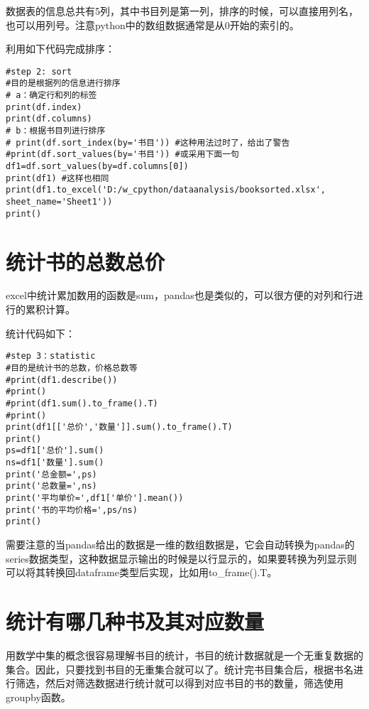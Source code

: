 \documentclass[twoside,11pt]{book}
\begin{document}
数据表的信息总共有5列，其中书目列是第一列，排序的时候，可以直接用列名，也可以用列号。注意python中的数组数据通常是从0开始的索引的。

利用如下代码完成排序：
\begin{lstlisting}
#step 2: sort
#目的是根据列的信息进行排序
# a：确定行和列的标签
print(df.index)
print(df.columns)
# b：根据书目列进行排序
# print(df.sort_index(by='书目')) #这种用法过时了，给出了警告
#print(df.sort_values(by='书目')) #或采用下面一句
df1=df.sort_values(by=df.columns[0])
print(df1) #这样也相同
print(df1.to_excel('D:/w_cpython/dataanalysis/booksorted.xlsx', sheet_name='Sheet1'))
print()
\end{lstlisting}

\section{统计书的总数总价}

excel中统计累加数用的函数是sum，pandas也是类似的，可以很方便的对列和行进行的累积计算。

统计代码如下：
\begin{lstlisting}
#step 3：statistic
#目的是统计书的总数，价格总数等
#print(df1.describe())
#print()
#print(df1.sum().to_frame().T)
#print()
print(df1[['总价','数量']].sum().to_frame().T)
print()
ps=df1['总价'].sum()
ns=df1['数量'].sum()
print('总金额=',ps)
print('总数量=',ns)
print('平均单价=',df1['单价'].mean())
print('书的平均价格=',ps/ns)
print()
\end{lstlisting}

需要注意的当pandas给出的数据是一维的数组数据是，它会自动转换为pandas的series数据类型，这种数据显示输出的时候是以行显示的，如果要转换为列显示则可以将其转换回dataframe类型后实现，比如用to\_frame().T。

\section{统计有哪几种书及其对应数量}

用数学中集的概念很容易理解书目的统计，书目的统计数据就是一个无重复数据的集合。因此，只要找到书目的无重集合就可以了。统计完书目集合后，根据书名进行筛选，然后对筛选数据进行统计就可以得到对应书目的书的数量，筛选使用groupby函数。
\end{document}
